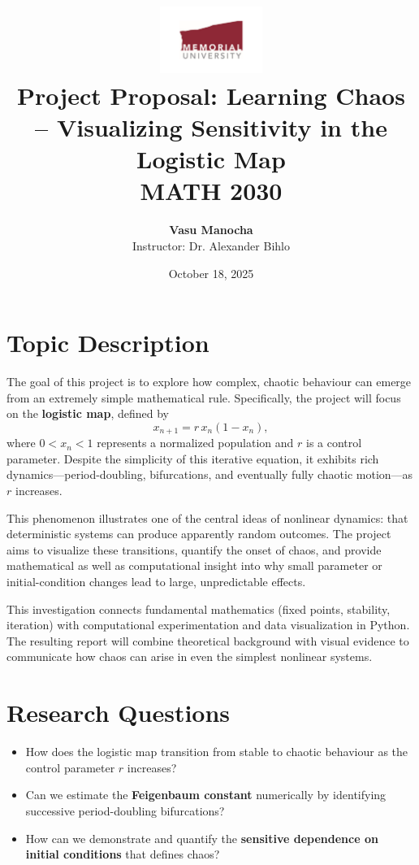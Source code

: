 \documentclass[12pt]{article}
\title{
    \includegraphics[width=0.25\textwidth]{mun_logo.pdf}\\[1em]
    \textbf{Project Proposal: Learning Chaos – Visualizing Sensitivity in the Logistic Map}\\
    \vspace{0.5em}
    \large MATH 2030 
}
\author{
    \textbf{Vasu Manocha} \\
    \vspace{0.3em}
    Instructor: Dr. Alexander Bihlo
}
\date{October 18, 2025}
\begin{document}
\maketitle
\thispagestyle{empty}
\clearpage

\setcounter{page}{1}


\section{Topic Description}
The goal of this project is to explore how complex, chaotic behaviour can emerge from an extremely simple mathematical rule. Specifically, the project will focus on the \textbf{logistic map}, defined by
\[
x_{n+1} = r\,x_n(1 - x_n),
\]
where \(0 < x_n < 1\) represents a normalized population and \(r\) is a control parameter. Despite the simplicity of this iterative equation, it exhibits rich dynamics—period-doubling, bifurcations, and eventually fully chaotic motion—as \(r\) increases.

This phenomenon illustrates one of the central ideas of nonlinear dynamics: that deterministic systems can produce apparently random outcomes. The project aims to visualize these transitions, quantify the onset of chaos, and provide mathematical as well as computational insight into why small parameter or initial-condition changes lead to large, unpredictable effects.

This investigation connects fundamental mathematics (fixed points, stability, iteration) with computational experimentation and data visualization in Python. The resulting report will combine theoretical background with visual evidence to communicate how chaos can arise in even the simplest nonlinear systems.


\section{Research Questions}
\begin{itemize}
    \item How does the logistic map transition from stable to chaotic behaviour as the control parameter \(r\) increases?
    \item Can we estimate the \textbf{Feigenbaum constant} numerically by identifying successive period-doubling bifurcations?
    \item How can we demonstrate and quantify the \textbf{sensitive dependence on initial conditions} that defines chaos?
\end{itemize}
\end{document}
